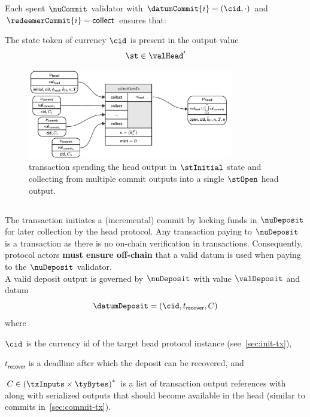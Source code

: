 \noindent Each spent $\nuCommit$ validator with $\datumCommit{i} = (\cid,\cdot)$ and $\redeemerCommit{i} = \mathsf{collect}$ ensures that:
\begin{menumerate}
  \item The state token of currency $\cid$ is present in the output value
  \[
	\st \in \valHead'
  \]
\end{menumerate}

\begin{figure}
  \centering
  \includegraphics[width=0.8\textwidth]{Hydra/Protocol/Figures/collectComTx.pdf}
  \caption{\mtxCCom{} transaction spending the head output in $\stInitial$
	state and collecting from multiple commit outputs into a single
	$\stOpen$ head output.}\label{fig:collectComTx}
\end{figure}


\subsection{}\label{sec:deposit-tx}

\noindent The \mtxDeposit{} transaction initiates a (incremental) commit by
locking funds in $\nuDeposit$ for later collection by the head protocol. Any
transaction paying to $\nuDeposit$ is a \mtxDeposit{} transaction as there is no
on-chain verification in \mtxDeposit{} transactions. Consequently, protocol
actors \textbf{must ensure off-chain} that a valid datum is used when paying to
the $\nuDeposit$ validator. \\

\noindent A valid deposit output is governed by $\nuDeposit$ with value $\valDeposit$ and datum
\[
  \datumDeposit = (\cid, t_{\mathsf{recover}}, C)
\]
where
\begin{mitemize}
  \item $\cid$ is the currency id of the target head protocol instance (see~\ref{sec:init-tx}),
  \item $t_{\mathsf{recover}}$ is a deadline after which the deposit can be recovered, and
  \item $C \in {(\txInputs \times \tyBytes)}^{*}$ is a list of transaction output
  references with along with serialized outputs that should become available in
  the head (similar to commits in~\ref{sec:commit-tx}).
\end{mitemize}

